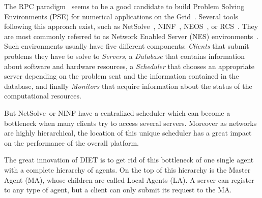 \documentclass[12pt,a4paper]{book}
\newcommand{\nsl}{NetSolve}
\begin{document}
The RPC paradigm~\cite{CM00,MNS+00} seems to be a good candidate to build
Problem Solving Environments (PSE) for numerical applications on the
Grid~\cite{HR00}. Several tools following this approach exist, such as
\nsl~\cite{nug}, NINF~\cite{NSS99}, NEOS~\cite{FMM00}, or RCS~\cite{AGM97}. They
are most commonly referred to as Network Enabled Server (NES)
environments~\cite{MNS+00}. Such environments usually have five different
components: \emph{Clients} that submit problems they have to solve to
\emph{Servers}, a \emph{Database} that contains information about software and
hardware resources, a \emph{Scheduler} that chooses an appropriate server
depending on the problem sent and the information contained in the database, and
finally \emph{Monitors} that acquire information about the status of the
computational resources.

But \nsl\ or NINF have a centralized scheduler which can become a bottleneck
when many clients try to access several servers.  Moreover as networks are
highly hierarchical, the location of this unique scheduler has a great impact on
the performance of the overall platform.

The great innovation of DIET is to get rid of this bottleneck of one single
agent with a complete hierarchy of agents. On the top of this hierarchy is the
Master Agent (MA), whose children are called Local Agents (LA).  A server can
register to any type of agent, but a client can only submit its request to the
MA.

%
%
\newpage


%
%
\newpage


%
%
\newpage


%
%
\newpage



%
\newpage


%
%
\newpage






\end{document}
